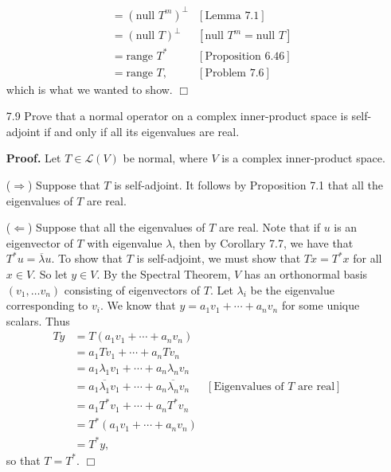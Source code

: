 \documentclass[9pt]{article}
\newcommand{\qed}{\hfill \ensuremath{\Box}}
\begin{document}
\begin{enumerate}
\begin{align*}
            &= (\text{null } T^m)^\perp &[\text{Lemma }7.1] \\
            &= (\text{null } T)^\perp &[\text{null }T^m = \text{null }T] \\
            &= \text{range } T^* &[\text{Proposition }6.46] \\
            &= \text{range } T, &[\text{Problem }7.6]
      \end{align*}
      which is what we wanted to show. \qed
   \item[7.9]  Prove that a normal operator on a complex inner-product space is
               self-adjoint if and only if all its eigenvalues are real.

      \textbf{Proof.} Let $T \in \mathcal{L}(V)$ be normal, where $V$ is a 
      complex inner-product space.

      ($\Longrightarrow$) Suppose that $T$ is self-adjoint. It follows by 
      Proposition 7.1 that all the eigenvalues of $T$ are real.

      ($\Longleftarrow$) Suppose that all the eigenvalues of $T$ are real. Note
      that if $u$ is an eigenvector of $T$ with eigenvalue $\lambda$, then by 
      Corollary 7.7, we have that $T^*u = \overline{\lambda}u$. To show that
      $T$ is self-adjoint, we must show that $Tx = T^*x$ for all $x \in V$. So
      let $y \in V$. By the Spectral Theorem, $V$ has an orthonormal basis
      $(v_1, \ldots v_n)$ consisting of eigenvectors of $T$. Let $\lambda_i$
      be the eigenvalue corresponding to $v_i$. We know that
      $y = a_1v_1 + \cdots + a_nv_n$ for some unique scalars. Thus
      \begin{align*}
         Ty &= T(a_1v_1 + \cdots + a_nv_n) \\
            &= a_1Tv_1 + \cdots + a_nTv_n \\
            &= a_1\lambda_1v_1 + \cdots + a_n\lambda_nv_n \\
            &= a_1\overline{\lambda_1}v_1 + \cdots + a_n\overline{\lambda_n}v_n
            &[\text{Eigenvalues of $T$ are real}] \\
            &= a_1T^*v_1 + \cdots + a_nT^*v_n \\
            &= T^*(a_1v_1 + \cdots + a_nv_n) \\
            &= T^*y,
      \end{align*}
      so that $T = T^*$. \qed
\end{enumerate}
\end{document}

